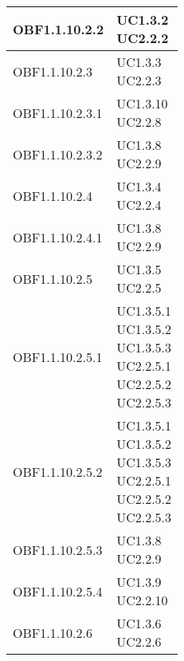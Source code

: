 \documentclass{scalatekids-article}
\begin{document}
\begin{longtable}[H]{|p{5.5cm}|p{5.5cm}|}
\hline
OBF1.1.10.2.2 & \multiLineCell[t]{UC1.3.2\\UC2.2.2\\}\\
\hline
OBF1.1.10.2.3 & \multiLineCell[t]{UC1.3.3\\UC2.2.3\\}\\
\hline
OBF1.1.10.2.3.1 & \multiLineCell[t]{UC1.3.10\\UC2.2.8\\}\\
\hline
OBF1.1.10.2.3.2 & \multiLineCell[t]{UC1.3.8\\UC2.2.9\\}\\
\hline
OBF1.1.10.2.4 & \multiLineCell[t]{UC1.3.4\\UC2.2.4\\}\\
\hline
OBF1.1.10.2.4.1 & \multiLineCell[t]{UC1.3.8\\UC2.2.9\\}\\
\hline
OBF1.1.10.2.5 & \multiLineCell[t]{UC1.3.5\\UC2.2.5\\}\\
\hline
OBF1.1.10.2.5.1 & \multiLineCell[t]{UC1.3.5.1\\UC1.3.5.2\\UC1.3.5.3\\UC2.2.5.1\\UC2.2.5.2\\UC2.2.5.3\\}\\
\hline
OBF1.1.10.2.5.2 & \multiLineCell[t]{UC1.3.5.1\\UC1.3.5.2\\UC1.3.5.3\\UC2.2.5.1\\UC2.2.5.2\\UC2.2.5.3\\}\\
\hline
OBF1.1.10.2.5.3 & \multiLineCell[t]{UC1.3.8\\UC2.2.9\\}\\
\hline
OBF1.1.10.2.5.4 & \multiLineCell[t]{UC1.3.9\\UC2.2.10\\}\\
\hline
OBF1.1.10.2.6 & \multiLineCell[t]{UC1.3.6\\UC2.2.6\\}\\

\end{longtable}
\end{document}
